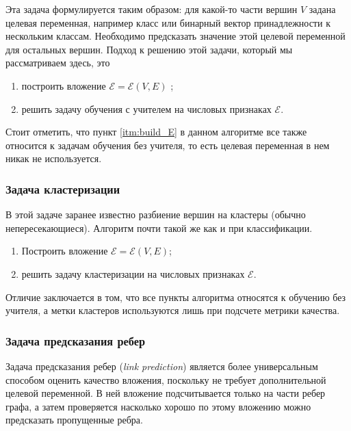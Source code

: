 \documentclass[12pt,a4paper]{extarticle}
\newcommand{\E}{\mathcal{E}}
\begin{document}
    Эта задача формулируется таким образом: для какой-то части вершин $V$ задана целевая переменная, например класс или бинарный вектор принадлежности к нескольким классам. Необходимо предсказать значение этой целевой переменной для остальных вершин.
    Подход к решению этой задачи, который мы рассматриваем здесь, это 
    \begin{enumerate}
        \item построить вложение $\E = \E(V, E)$ \label{itm:build_E};
        \item решить задачу обучения с учителем на числовых признаках $\E$.
    \end{enumerate}
    
    Стоит отметить, что пункт \ref{itm:build_E} в данном алгоритме все также относится к задачам обучения без учителя, то есть целевая переменная в нем никак не используется.
    
    \subsubsection{Задача кластеризации}
    
    В этой задаче заранее известно разбиение вершин на кластеры (обычно непересекающиеся). Алгоритм почти такой же как и при классификации.
    
    \begin{enumerate}
        \item Построить вложение $\E = \E(V, E)$;
        \item решить задачу кластеризации на числовых признаках $\E$.
    \end{enumerate}
    
    Отличие заключается в том, что все пункты алгоритма относятся к обучению без учителя, а метки кластеров используются лишь при подсчете метрики качества.
    
    \subsubsection{Задача предсказания ребер}
    
    Задача предсказания ребер (\textit{link prediction}) является более универсальным способом оценить качество вложения, поскольку не требует дополнительной целевой переменной. В ней вложение подсчитывается только на части ребер графа, а затем проверяется насколько хорошо по этому вложению можно предсказать пропущенные ребра.
    
\end{document}
